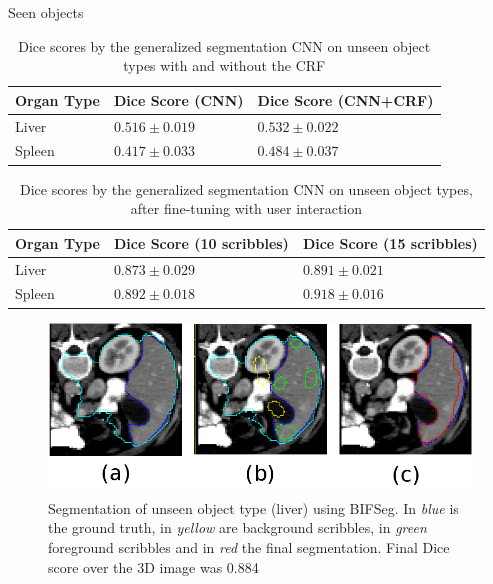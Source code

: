 \documentclass[10pt]{beamer}
\begin{document}
\begin{frame}[fragile]{Seen objects}

  \begin{table}[h!]
    \centering
    \begin{tabular}{|l|l|l|}
      \hline
      Organ Type   & Dice Score (CNN)  & Dice Score (CNN+CRF) \\ \hline
      Liver        & $0.516 \pm 0.019$ & $0.532 \pm 0.022$\\ 
      Spleen       & $0.417 \pm 0.033$ & $0.484 \pm 0.037$ \\ \hline
    \end{tabular}
    \caption{Dice scores by the generalized segmentation CNN on unseen object types with and without the CRF}
    \label{tab:resGenUnseen}
  \end{table}


  \begin{table}[h!]
    \centering
    \begin{tabular}{|l|l|l|}
      \hline
      Organ Type   & Dice Score (10 scribbles) & Dice Score (15 scribbles) \\ \hline
      Liver        & $0.873 \pm 0.029$ & $0.891 \pm 0.021$\\ 
      Spleen       & $0.892 \pm 0.018$ & $0.918 \pm 0.016$ \\ \hline
    \end{tabular}
    \caption{Dice scores by the generalized segmentation CNN on unseen object types, after fine-tuning with user interaction}
    \label{tab:resGenBIFUnseen}
  \end{table}
  
\end{frame}


%
%


\begin{frame}[fragile]{}
  
 \begin{figure}[h!]
    \centering
    \includegraphics[scale=0.38]{pictures/genBIFSEG2}
    \caption{Segmentation of unseen object type (liver) using BIFSeg. In \textit{blue} is the ground truth,
      in \textit{yellow} are background scribbles, in \textit{green} foreground scribbles and in \textit{red} the final segmentation.
      Final Dice score over the 3D image was 0.884
    }
    \label{fig:spleenPlot}
  \end{figure}
  
\end{frame}
\end{document}

